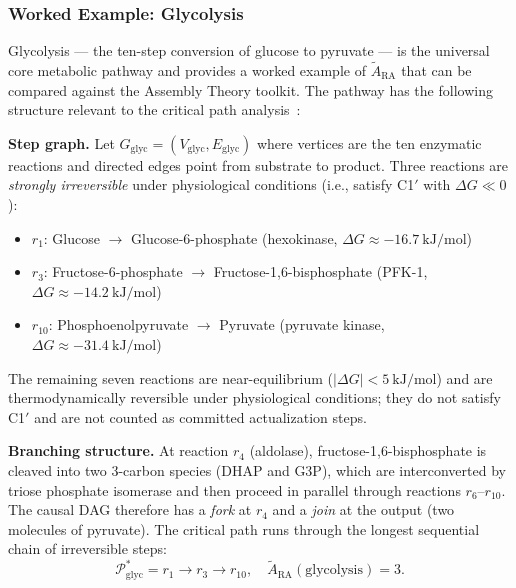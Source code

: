 \documentclass[11pt,a4paper]{article}
\theoremstyle{remark}
\begin{document}
\subsubsection{Worked Example: Glycolysis}
\label{sec:glycolysis_example}

Glycolysis --- the ten-step conversion of glucose to pyruvate --- is the
universal core metabolic pathway and provides a worked example of
$\tilde{A}_{\mathrm{RA}}$ that can be compared against the Assembly Theory
toolkit. The pathway has the following structure relevant to the critical
path analysis~\citep{Meyerhof1945}:

\medskip\noindent
\textbf{Step graph.} Let $G_{\mathrm{glyc}} = (V_{\mathrm{glyc}},
E_{\mathrm{glyc}})$ where vertices are the ten enzymatic reactions and
directed edges point from substrate to product. Three reactions are
\emph{strongly irreversible} under physiological conditions (i.e., satisfy
C1$'$ with $\Delta G \ll 0$):
\begin{itemize}[noitemsep]
  \item $r_1$: Glucose $\to$ Glucose-6-phosphate \hfill (hexokinase,
    $\Delta G \approx -16.7~\mathrm{kJ/mol}$)
  \item $r_3$: Fructose-6-phosphate $\to$ Fructose-1,6-bisphosphate
    \hfill (PFK-1, $\Delta G \approx -14.2~\mathrm{kJ/mol}$)
  \item $r_{10}$: Phosphoenolpyruvate $\to$ Pyruvate \hfill (pyruvate kinase,
    $\Delta G \approx -31.4~\mathrm{kJ/mol}$)
\end{itemize}
The remaining seven reactions are near-equilibrium ($|\Delta G| < 5~\mathrm{kJ/mol}$)
and are thermodynamically reversible under physiological conditions; they do
not satisfy C1$'$ and are not counted as committed actualization steps.

\medskip\noindent
\textbf{Branching structure.} At reaction $r_4$ (aldolase), fructose-1,6-bisphosphate
is cleaved into two 3-carbon species (DHAP and G3P), which are interconverted
by triose phosphate isomerase and then proceed in parallel through reactions
$r_6$--$r_{10}$. The causal DAG therefore has a \emph{fork} at $r_4$ and a
\emph{join} at the output (two molecules of pyruvate). The critical path runs
through the longest sequential chain of irreversible steps:
\begin{equation}
  \mathcal{P}^*_{\mathrm{glyc}} = r_1 \to r_3 \to r_{10},
  \quad
  \tilde{A}_{\mathrm{RA}}(\mathrm{glycolysis}) = 3.
  \label{eq:glycolysis_cgara}
\end{equation}
\end{document}
